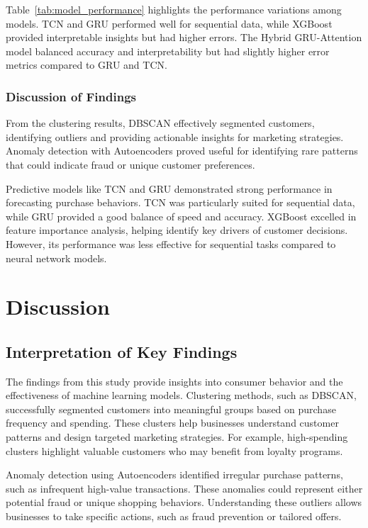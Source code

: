 \documentclass[12pt, a4paper,twoside]{report}
\theoremstyle{plain} %
\theoremstyle{definition} %
\theoremstyle{remark} %
\numberwithin{equation}{chapter}
\begin{document}
Table~\ref{tab:model_performance} highlights the performance variations among models. TCN and GRU performed well for sequential data, while XGBoost provided interpretable insights but had higher errors. The Hybrid GRU-Attention model balanced accuracy and interpretability but had slightly higher error metrics compared to GRU and TCN.

\subsection{Discussion of Findings}

From the clustering results, DBSCAN effectively segmented customers, identifying outliers and providing actionable insights for marketing strategies. Anomaly detection with Autoencoders proved useful for identifying rare patterns that could indicate fraud or unique customer preferences.

Predictive models like TCN and GRU demonstrated strong performance in forecasting purchase behaviors. TCN was particularly suited for sequential data, while GRU provided a good balance of speed and accuracy. XGBoost excelled in feature importance analysis, helping identify key drivers of customer decisions. However, its performance was less effective for sequential tasks compared to neural network models.



\chapter{Discussion}

\section{Interpretation of Key Findings}

The findings from this study provide insights into consumer behavior and the effectiveness of machine learning models. Clustering methods, such as DBSCAN, successfully segmented customers into meaningful groups based on purchase frequency and spending. These clusters help businesses understand customer patterns and design targeted marketing strategies. For example, high-spending clusters highlight valuable customers who may benefit from loyalty programs.

Anomaly detection using Autoencoders identified irregular purchase patterns, such as infrequent high-value transactions. These anomalies could represent either potential fraud or unique shopping behaviors. Understanding these outliers allows businesses to take specific actions, such as fraud prevention or tailored offers.
\end{document}
